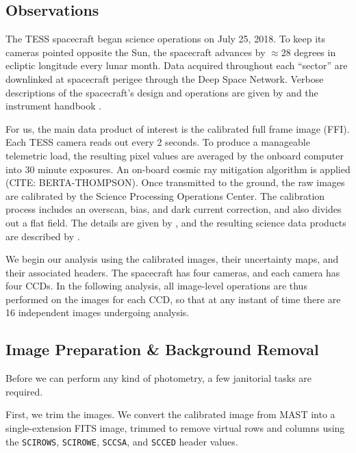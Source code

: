 \documentclass[12pt,twocolumn,tighten]{aastex62}
\begin{document}
\subsection{Observations}
\label{subsec:observations}


The TESS spacecraft began science operations on July 25, 2018.  To
keep its cameras pointed opposite the Sun, the spacecraft advances by
$\approx$$28$ degrees in ecliptic longitude every lunar month.  Data
acquired throughout each ``sector'' are downlinked at spacecraft
perigee through the Deep Space Network.  Verbose descriptions of the
spacecraft's design and operations are given by
\citet{ricker_transiting_2015} and the instrument handbook
\citep{vanderspek_2018}.

For us, the main data product of interest is the calibrated full frame
image (FFI).  Each TESS camera reads out every 2 seconds.  To produce
a manageable telemetric load, the resulting pixel values are averaged
by the onboard computer into 30 minute exposures. An on-board cosmic
ray mitigation algorithm is applied (CITE: BERTA-THOMPSON). Once
transmitted to the ground, the raw images are calibrated by the
Science Processing Operations Center.  The calibration process
includes an overscan, bias, and dark current correction, and also
divides out a flat field.  The details are given by
\citet{clarke_kepler_2017}, and the resulting science data products
are described by \citet{tess_data_product_description_2018}.

We begin our analysis using the calibrated images, their uncertainty
maps, and their associated headers.  The spacecraft has four cameras,
and each camera has four CCDs.  In the following analysis, all
image-level operations are thus performed on the images for each CCD,
so that at any instant of time there are 16 independent images
undergoing analysis.


\subsection{Image Preparation \& Background Removal}
\label{subsec:preparation}

Before we can perform any kind of photometry, a few janitorial tasks
are required.

First, we trim the images.  We convert the calibrated image from MAST
into a single-extension FITS image, trimmed to remove virtual rows and
columns using the \texttt{SCIROWS}, \texttt{SCIROWE}, \texttt{SCCSA},
and \texttt{SCCED} header values.
\end{document}
